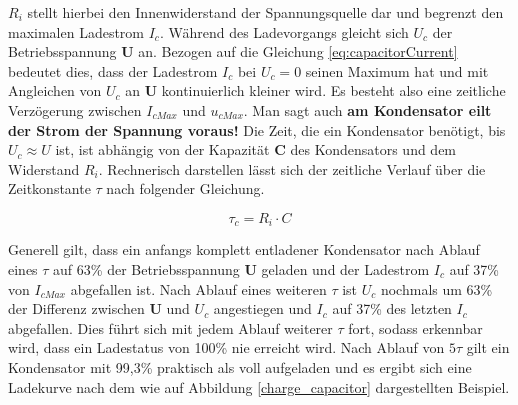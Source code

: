 {{\noindent \(R_i\) stellt hierbei den Innenwiderstand der Spannungsquelle dar und begrenzt den maximalen Ladestrom \(I_c\). Während des Ladevorgangs gleicht sich \(U_c\) der Betriebsspannung \textbf{U} an. Bezogen auf die Gleichung \eqref{eq:capacitorCurrent} bedeutet dies, dass der Ladestrom \(I_c\) bei \(U_c = 0\) seinen Maximum hat und mit Angleichen von \(U_c\) an \textbf{U} kontinuierlich kleiner wird. Es besteht also eine zeitliche Verzögerung zwischen \(I_{cMax}\) und \(u_{cMax}\). Man sagt auch \textbf{am Kondensator eilt der Strom der Spannung voraus!} Die Zeit, die ein Kondensator benötigt, bis \(U_c \approx U\) ist, ist abhängig von der Kapazität \textbf{C} des Kondensators und dem Widerstand \(R_i\). Rechnerisch darstellen lässt sich der zeitliche Verlauf über die Zeitkonstante \(\tau\) nach folgender Gleichung.

\begin{equation}
  \tau_c = R_i \cdot C
  \label{eq:tauCapacitor}
\end{equation}

\noindent Generell gilt, dass ein anfangs komplett entladener Kondensator nach Ablauf eines \(\tau \) auf 63\% der Betriebsspannung \textbf{U} geladen und der Ladestrom \(I_c\) auf 37\% von \(I_{cMax}\) abgefallen ist. Nach Ablauf eines weiteren \(\tau \) ist \(U_c\) nochmals um 63\% der Differenz zwischen \textbf{U} und \(U_c\) angestiegen und \(I_c\) auf 37\% des letzten \(I_c\) abgefallen. Dies führt sich mit jedem Ablauf weiterer \(\tau \) fort, sodass erkennbar wird, dass ein Ladestatus von 100\% nie erreicht wird. Nach Ablauf von \(5\tau \) gilt ein Kondensator mit 99,3\% praktisch als voll aufgeladen und es ergibt sich eine Ladekurve nach dem wie auf Abbildung \ref{charge_capacitor} dargestellten Beispiel. 

\clearpage

}}
